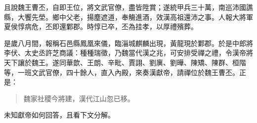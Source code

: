 且說魏王曹丕，自即王位，將文武官僚，盡皆陞賞；遂統甲兵三十萬，南巡沛國譙縣，大饗先塋。鄉中父老，揚塵遮道，奉觴進酒，效漢高祖還沛之事。人報大將軍夏侯惇病危，丕即還鄴郡。時惇已卒，丕為挂孝，以厚禮殯葬。

是歲八月間，報稱石邑縣鳳凰來儀，臨淄城麒麟出現，黃龍現於鄴郡。於是中郎將李伏、太史丞許芝商議：種種瑞徵，乃魏當代漢之兆，可安排受禪之禮，令漢帝將天下讓於魏王。遂同華歆、王朗、辛毗、賈詡、劉廙、劉曄、陳矯、陳群、桓階等，一班文武官僚，四十餘人，直入內殿，來奏漢獻帝，請禪位於魏王曹丕。正是：

\begin{quote}
魏家社稷今將建，漢代江山忽已移。
\end{quote}

未知獻帝如何回答，且看下文分解。
